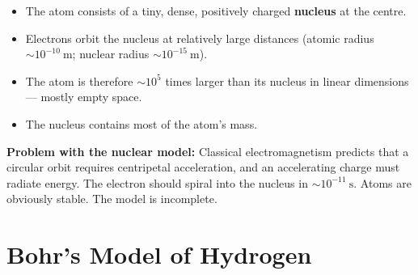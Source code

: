 \begin{diagbox}
\begin{center}
\end{center}
\end{diagbox}

\begin{defbox}
\begin{itemize}[noitemsep]
  \item The atom consists of a tiny, dense, positively
  charged \textbf{nucleus} at the centre.
  \item Electrons orbit the nucleus at relatively
  large distances (atomic radius $\sim 10^{-10}\ \text{m}$;
  nuclear radius $\sim 10^{-15}\ \text{m}$).
  \item The atom is therefore $\sim 10^5$ times larger
  than its nucleus in linear dimensions --- mostly
  empty space.
  \item The nucleus contains most of the atom's mass.
\end{itemize}

\textbf{Problem with the nuclear model:} Classical
electromagnetism predicts that a circular orbit
requires centripetal acceleration, and an accelerating
charge must radiate energy. The electron should spiral
into the nucleus in $\sim 10^{-11}\ \text{s}$. Atoms
are obviously stable. The model is incomplete.
\end{defbox}

\section{Bohr's Model of Hydrogen}

